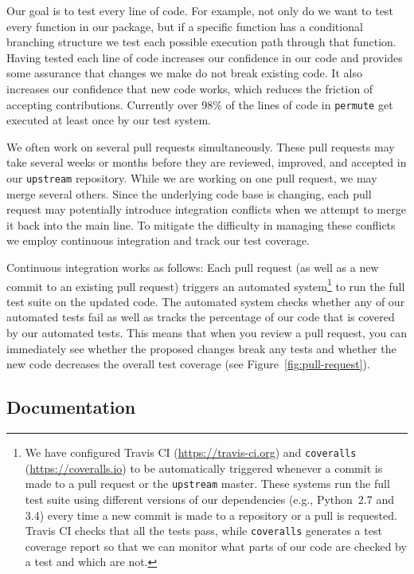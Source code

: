 \documentclass[]{article}
\begin{document}
Our goal is to test every line of code.
For example, not only do we want to test every function in our package, but if
a specific function has a conditional branching structure we test each
possible execution path through that function.
Having tested each line of code increases our confidence in our code and
provides some assurance that changes we make do not break existing code.
It also increases our confidence that new code works, which reduces the
friction of accepting contributions.
Currently over 98\% of the lines of code in \texttt{permute} get executed at
least once by our test system.

We often work on several pull requests simultaneously.
These pull requests may take several weeks or months before they are reviewed,
improved, and accepted in our \texttt{upstream} repository.
While we are working on one pull request, we may merge several others.
Since the underlying code base is changing, each pull request may potentially
introduce integration conflicts when we attempt to merge it back into
the main line.
To mitigate the difficulty in managing these conflicts we employ
continuous integration and track our test coverage.

Continuous integration works as follows:
Each pull request (as well as a new commit to an existing pull request) triggers
an automated system\footnote{
We have configured Travis CI (\url{https://travis-ci.org}) 
and \texttt{coveralls} (\url{https://coveralls.io})
to be automatically triggered whenever a commit is made to a pull request
or the \texttt{upstream} master.
These systems run the full test suite using different versions of our
dependencies (e.g., Python~2.7 and 3.4) every time a new commit is made to a
repository or a pull is requested.
Travis CI checks that all the tests pass, while \texttt{coveralls} generates a
test coverage report so that we can monitor what parts of our code are checked
by a test and which are not.
}
to run the full test suite on the updated code.
The automated system checks whether any of our automated tests fail as well
as tracks the percentage of our code that is covered by our automated tests.
This means that when you review a pull request, you can immediately see
whether the proposed changes break any tests and whether the new
code decreases the overall test coverage (see Figure~\ref{fig:pull-request}).

\subsection{Documentation}
\end{document}
